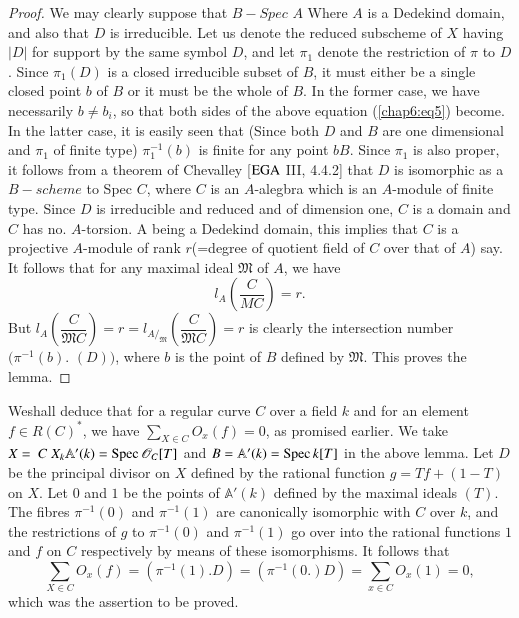 \begin{proof}
  We may clearly suppose that $B-Spec$ $A$ Where $A$ is a Dedekind
  domain, and also that $D$ is irreducible. Let us denote the reduced
  subscheme of $X$ having $|D|$ for support by the same symbol $D$,
  and let $\pi_{1}$ denote the restriction of $\pi$ to $D$. Since
  $\pi_{1}(D)$ is a closed irreducible subset of $B$, it must either
  be a single closed point $b$ of $B$ or it must be the whole of
  $B$. In the former case, we have necessarily $b\neq b_i$, so that
  both sides of the above equation (\ref{chap6:eq5}) become. In the latter case,
  it is easily seen that (Since both $D$ and $B$ are one dimensional
  and $\pi_1$ of finite type) $\pi^{-1}_{1}(b)$ is finite for any
  point $b  B$. Since $\pi_1$ is also proper, it follows from a
  theorem of Chevalley [$\operatorname{EGA}$ III, 4.4.2] that $D$ is isomorphic as a
  $B-scheme$ to Spec $C$, where $C$  is an $A$-alegbra which is an
  $A$-module of finite type. Since $D$ is irreducible and reduced and of
  dimension one, $C$ is a domain and $C$ has no. $A$-torsion. A being a
  Dedekind domain, this implies that $C$ is a projective $A$-module of
  rank $r$(=degree of quotient field of $C$ over that of $A$) say. It
  follows that for any maximal ideal $\mathfrak{M}$ of $A$, we have 
  $$
  l_A\left(\frac{C}{M C}\right)=r.
  $$
  But
  $l_A \left(\dfrac{C}{\mathfrak{M}C}\right) = r = l_{A/_\mathfrak{M}}
  \left(\dfrac{C}{\mathfrak{M}C} \right)=r$
  is clearly the intersection number $(\pi^{-1}(b)$. $(D))$, where $b$ is
  the point of $B$ defined by $\mathfrak{M}$. This proves the lemma.  
\end{proof}

We\pageoriginale shall deduce that for a regular curve $C$ over a
field $k$ and for 
an element $f\in R(C)^{*}$, we have $\sum\limits_{X\in C} O_x(f)=0$,
as promised earlier. We take $X = ~C ~X_k \mathbb{A}'(k)=\operatorname{Spec}
\mathscr{O}_C[T]$ and $B=\mathbb{A'}(k)=\operatorname{Spec} k[T]$ in the above
lemma. Let $D$ be the principal divisor on $X$ defined by the rational
function $g=T f+(1-T)$ on $X$. Let $0$ and $1$ be the points of
$\mathbb{A'}(k)$ defined by the maximal ideals $(T)$. The fibres
$\pi^{-1}(0)$ and $\pi^{-1}(1)$ are canonically isomorphic with $C$
over $k$, and the restrictions of $g$ to $\pi^{-1}(0)$ and
$\pi^{-1}(1)$ go over into the rational functions $1$ and $f$ on $C$
respectively by means of these isomorphisms. It follows that 
$$
\sum\limits _{X\in
  C}O_x(f)=(\pi^{-1}(1).D)=(\pi^{-1}(0.)D)=\sum\limits_{x \in C}
O_x(1)=0, 
$$
which was the assertion to be proved.  


